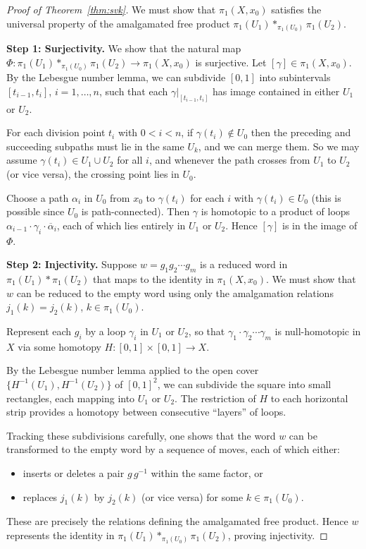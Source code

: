 \documentclass[12pt,a4paper,openany]{book}
\theoremstyle{definition}
\theoremstyle{plain}
\theoremstyle{remark}
\begin{document}
\begin{proof}[Proof of Theorem~\ref{thm:svk}]
  We must show that $\pi_1(X, x_0)$ satisfies the universal property of the
  amalgamated free product $\pi_1(U_1) *_{\pi_1(U_0)} \pi_1(U_2)$.

  \medskip
  \noindent\textbf{Step 1: Surjectivity.}
  We show that the natural map
  $\Phi\colon \pi_1(U_1) *_{\pi_1(U_0)} \pi_1(U_2) \to \pi_1(X, x_0)$ is
  surjective.  Let $[\gamma] \in \pi_1(X, x_0)$.  By the Lebesgue number
  lemma, we can subdivide $[0,1]$ into subintervals $[t_{i-1}, t_i]$,
  $i = 1, \ldots, n$, such that each $\gamma\!\big|_{[t_{i-1}, t_i]}$ has
  image contained in either $U_1$ or $U_2$.

  For each division point $t_i$ with $0 < i < n$, if $\gamma(t_i) \notin U_0$
  then the preceding and succeeding subpaths must lie in the same $U_k$, and we
  can merge them.  So we may assume $\gamma(t_i) \in U_1 \cup U_2$ for all $i$,
  and whenever the path crosses from $U_1$ to $U_2$ (or vice versa), the
  crossing point lies in $U_0$.

  Choose a path $\alpha_i$ in $U_0$ from $x_0$ to $\gamma(t_i)$ for each $i$
  with $\gamma(t_i) \in U_0$ (this is possible since $U_0$ is
  path-connected).  Then $\gamma$ is homotopic to a product of loops
  $\alpha_{i-1} \cdot \gamma_i \cdot \overline{\alpha}_i$, each of which lies
  entirely in $U_1$ or $U_2$.  Hence $[\gamma]$ is in the image of $\Phi$.

  \medskip
  \noindent\textbf{Step 2: Injectivity.}
  Suppose $w = g_1 g_2 \cdots g_m$ is a reduced word in
  $\pi_1(U_1) * \pi_1(U_2)$ that maps to the identity in $\pi_1(X, x_0)$.
  We must show that $w$ can be reduced to the empty word using only the
  amalgamation relations $j_1(k) = j_2(k)$, $k \in \pi_1(U_0)$.

  Represent each $g_i$ by a loop $\gamma_i$ in $U_1$ or $U_2$, so that
  $\gamma_1 \cdot \gamma_2 \cdots \gamma_m$ is null-homotopic in $X$ via some
  homotopy $H\colon [0,1] \times [0,1] \to X$.

  By the Lebesgue number lemma applied to the open cover $\{H^{-1}(U_1),
  H^{-1}(U_2)\}$ of $[0,1]^2$, we can subdivide the square into small
  rectangles, each mapping into $U_1$ or $U_2$.  The restriction of $H$ to
  each horizontal strip provides a homotopy between consecutive ``layers'' of
  loops.

  Tracking these subdivisions carefully, one shows that the word $w$ can be
  transformed to the empty word by a sequence of moves, each of which either:
  \begin{itemize}
    \item inserts or deletes a pair $g\, g^{-1}$ within the same factor, or
    \item replaces $j_1(k)$ by $j_2(k)$ (or vice versa) for some
      $k \in \pi_1(U_0)$.
  \end{itemize}
  These are precisely the relations defining the amalgamated free product.
  Hence $w$ represents the identity in $\pi_1(U_1) *_{\pi_1(U_0)} \pi_1(U_2)$,
  proving injectivity.


\end{proof}
\end{document}
